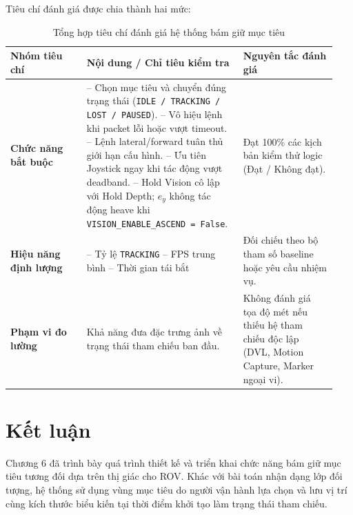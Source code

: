 \documentclass[../DoAn.tex]{subfiles}
\begin{document}
Tiêu chí đánh giá được chia thành hai mức:
\begin{table}[htbp]
    \centering
    \caption{Tổng hợp tiêu chí đánh giá hệ thống bám giữ mục tiêu}
    \label{tab:tieuchi_danhgia_vision}
    \renewcommand{\arraystretch}{1.3}
    \begin{tabular}{|p{0.22\linewidth}|p{0.45\linewidth}|p{0.27\linewidth}|}
        \hline
        \textbf{Nhóm tiêu chí} & \textbf{Nội dung / Chỉ tiêu kiểm tra} & \textbf{Nguyên tắc đánh giá} \\
        \hline
        \textbf{Chức năng bắt buộc} & 
        -- Chọn mục tiêu và chuyển đúng trạng thái (\texttt{IDLE / TRACKING / LOST / PAUSED}). \newline
        -- Vô hiệu lệnh khi packet lỗi hoặc vượt timeout. \newline
        -- Lệnh lateral/forward tuân thủ giới hạn cấu hình. \newline
        -- Ưu tiên Joystick ngay khi tác động vượt deadband. \newline
        -- Hold Vision cô lập với Hold Depth; $e_y$ không tác động heave khi \texttt{VISION\_ENABLE\_ASCEND = False}. & 
        Đạt 100\% các kịch bản kiểm thử logic (Đạt / Không đạt). \\
        \hline
        \textbf{Hiệu năng định lượng} & 
        -- Tỷ lệ \texttt{TRACKING} \newline
        -- FPS trung bình \newline
        -- Thời gian tái bắt\newline & 
        Đối chiếu theo bộ tham số baseline hoặc yêu cầu nhiệm vụ. \\
        \hline
        \textbf{Phạm vi đo lường} & 
        Khả năng đưa đặc trưng ảnh về trạng thái tham chiếu ban đầu. & 
        Không đánh giá tọa độ mét nếu thiếu hệ tham chiếu độc lập (DVL, Motion Capture, Marker ngoại vi). \\
        \hline
    \end{tabular}
\end{table}

\section{Kết luận}

Chương 6 đã trình bày quá trình thiết kế và triển khai chức năng bám giữ mục tiêu tương đối dựa trên thị giác cho ROV. Khác với bài toán nhận dạng lớp đối tượng, hệ thống sử dụng vùng mục tiêu do người vận hành lựa chọn và lưu vị trí cùng kích thước biểu kiến tại thời điểm khởi tạo làm trạng thái tham chiếu.
\end{document}
